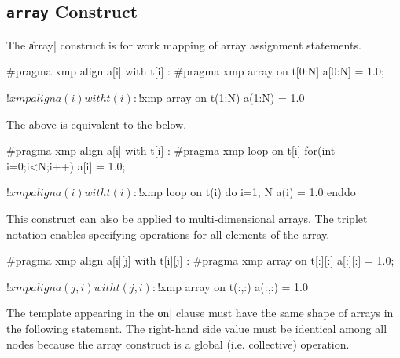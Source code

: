 

\subsection{{\tt array} Construct}

The \|array| construct is for work mapping of array assignment statements.

\begin{XCexample}
#pragma xmp align a[i] with t[i]
  :
#pragma xmp array on t[0:N]
a[0:N] = 1.0;
\end{XCexample}

\begin{XFexample}
!$xmp align a(i) with t(i)
  :
!$xmp array on t(1:N)
a(1:N) = 1.0
\end{XFexample}

The above is equivalent to the below.

\begin{XCexample}
#pragma xmp align a[i] with t[i]
  :
#pragma xmp loop on t[i]
for(int i=0;i<N;i++)
  a[i] = 1.0;
\end{XCexample}

\begin{XFexample}
!$xmp align a(i) with t(i)
  :
!$xmp loop on t(i)
do i=1, N
  a(i) = 1.0
enddo
\end{XFexample}

This construct can also be applied to multi-dimensional arrays. The
triplet notation enables specifying operations for all elements of the
array.

\begin{XCexample}
#pragma xmp align a[i][j] with t[i][j]
  :
#pragma xmp array on t[:][:]
a[:][:] = 1.0;
\end{XCexample}

\begin{XFexample}
!$xmp align a(j,i) with t(j,i)
  :
!$xmp array on t(:,:)
a(:,:) = 1.0
\end{XFexample}

\begin{mynote}
The template appearing in the \|on| clause must have
the same shape of
arrays in the following statement. The right-hand side value must be
identical among all nodes because the array construct is a global
  (i.e. collective) operation.
\end{mynote}
